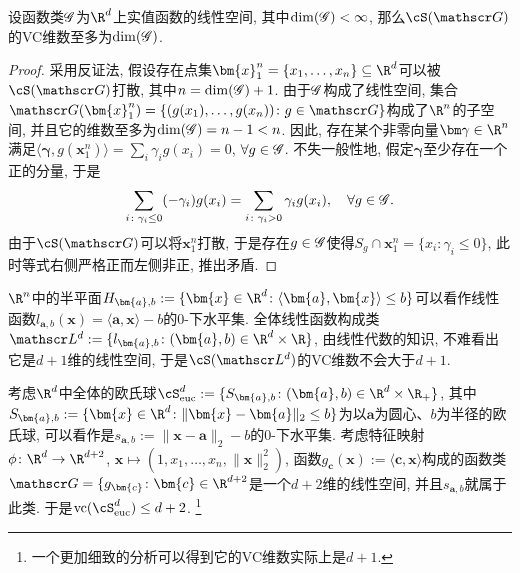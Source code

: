 \begin{proposition}
	设函数类$\mathscr{G}$为$\R^d$上实值函数的线性空间, 其中$\dim(\mathscr{G}) < \infty$, 那么$\cS(\sG)$的VC维数至多为$\dim(\mathscr{G})$. 	
\end{proposition}
\begin{proof}
	采用反证法, 假设存在点集$\bm{x}_1^n = \{x_1, \dots, x_n\} \subseteq \R^d$可以被$\cS(\sG)$打散, 其中$n = \dim(\mathscr{G}) + 1$.
	由于$\mathscr{G}$构成了线性空间, 集合$\sG(\bm{x}_1^n) = \{(g(x_1), \dots, g(x_n)) \colon g \in \sG\}$构成了$\R^n$的子空间, 并且它的维数至多为$\dim(\mathscr{G}) = n-1 < n$. 
	因此, 存在某个非零向量$\bm\gamma \in \R^n$满足$\langle \bm{\gamma}, g(\bm{x}_1^n) \rangle = \sum_i \gamma_i g(x_i) = 0$, $\forall g \in \mathscr{G}$. 
	不失一般性地, 假定$\bm{\gamma}$至少存在一个正的分量, 于是
	\begin{equation*}
		\sum_{i \colon \gamma_i \leq 0} (-\gamma_i) g(x_i)
		= \sum_{i \colon \gamma_i > 0} \gamma_i g(x_i), \quad
		\forall g \in \mathscr{G}. 
	\end{equation*}
	由于$\cS(\sG)$可以将$\bm{x}_1^n$打散, 于是存在$g \in \mathscr{G}$使得$S_g \cap \bm{x}_1^n = \{x_i \colon \gamma_i \leq 0\}$, 此时等式右侧严格正而左侧非正, 推出矛盾. 
\end{proof}

\begin{example}[$\R^d$中的半平面]
	$\R^n$中的半平面$H_{\bm{a},b} := \{\bm{x} \in \R^d \colon \langle \bm{a}, \bm{x} \rangle  \leq b\}$可以看作线性函数$l_{\bm{a},b}(\bm{x}) = \langle \bm{a}, \bm{x} \rangle - b$的$0$-下水平集. 
	全体线性函数构成类$\sL^d := \{l_{\bm{a},b} \colon (\bm{a}, b) \in \R^d \times \R \}$, 由线性代数的知识, 不难看出它是$d+1$维的线性空间, 于是$\cS(\sL^d)$的VC维数不会大于$d+1$. 
\end{example}


\begin{example}[$\R^d$中的球]
	考虑$\R^d$中全体的欧氏球$\cS^d_{\text{euc}} := \{S_{\bm{a},b} \colon (\bm{a},b) \in \R^d \times \R_{+}\}$, 其中$S_{\bm{a},b} := \{\bm{x} \in \R^d \colon \|\bm{x} - \bm{a}\|_2 \leq b\}$为以$\bm{a}$为圆心、$b$为半径的欧氏球, 可以看作是$s_{\bm{a},b} := \|\bm{x} - \bm{a}\|_2 - b$的$0$-下水平集. 
	考虑特征映射$\phi \colon \R^d \to \R^{d+2}$, $\bm x \mapsto \left(1, x_1, \dots, x_n, \|\bm x\|_2^2 \right)$, 函数$g_{\bm{c}}(\bm{x}) := \langle\bm{c}, \bm{x}\rangle$构成的函数类$\sG = \{g_{\bm{c}} \colon \bm{c} \in \R^{d+2}$是一个$d+2$维的线性空间, 并且$s_{\bm{a},b}$就属于此类. 
	于是$\vc(\cS^d_{\text{euc}}) \leq d+2$. \footnote{一个更加细致的分析可以得到它的VC维数实际上是$d+1$.}
\end{example}

























